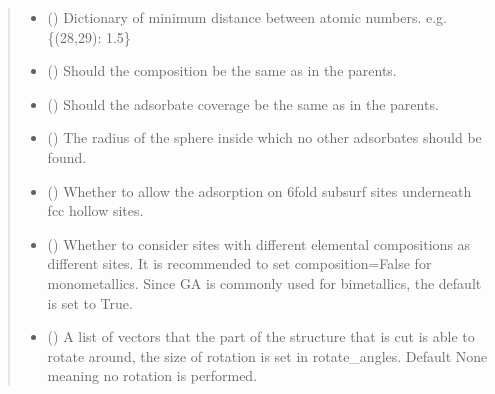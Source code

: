 \documentclass[letterpaper,10pt,english]{sphinxmanual}
\begin{document}
\begin{fulllineitems}
\begin{quote}
\begin{description}
\begin{itemize}
\item {} 
 () \textendash{} Dictionary of minimum distance between atomic numbers.
e.g. \{(28,29): 1.5\}

\item {} 
 (\sphinxstyleliteralemphasis{\sphinxupquote{, }}) \textendash{} Should the composition be the same as in the parents.

\item {} 
 (\sphinxstyleliteralemphasis{\sphinxupquote{, }}) \textendash{} Should the adsorbate coverage be the same as in the parents.

\item {} 
 (\sphinxstyleliteralemphasis{\sphinxupquote{, }}) \textendash{} The radius of the sphere inside which no other adsorbates
should be found.

\item {} 
 (\sphinxstyleliteralemphasis{\sphinxupquote{, }}) \textendash{} Whether to allow the adsorption on 6\sphinxhyphen{}fold subsurf sites
underneath fcc hollow sites.

\item {} 
 (\sphinxstyleliteralemphasis{\sphinxupquote{, }}) \textendash{} Whether to consider sites with different elemental compositions
as different sites. It is recommended to set composition=False
for monometallics. Since GA is commonly used for bimetallics,
the default is set to True.

\item {} 
 (\sphinxstyleliteralemphasis{\sphinxupquote{, }}) \textendash{} A list of vectors that the part of the structure that is cut
is able to rotate around, the size of rotation is set in
rotate\_angles. Default None meaning no rotation is performed.


\end{itemize}
\end{description}
\end{quote}
\end{fulllineitems}
\end{document}
